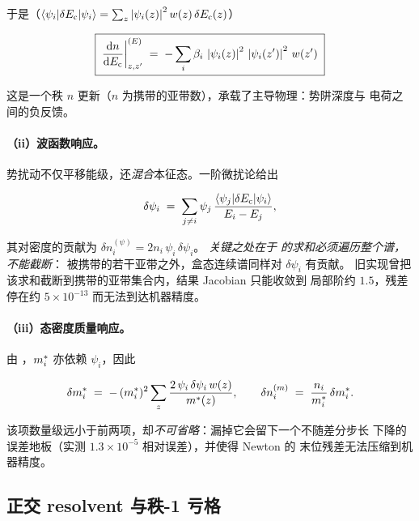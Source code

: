 于是（$\left\langle \psi_i|\delta E_{\mathrm{c}}|\psi_i \right\rangle=\sum_z\left\lvert \psi_i(z) \right\rvert^{2}w(z)\,\delta E_{\mathrm{c}}(z)$）

\begin{equation}
\boxed{\;
\frac{\mathrm{d} n}{\mathrm{d} E_{\mathrm{c}}}\bigg|^{(E)}_{z,z'}
\;=\; -\sum_i \beta_i\,\left\lvert \psi_i(z) \right\rvert^{2}\,\left\lvert \psi_i(z') \right\rvert^{2}\,w(z')
\;}
\label{eq:resp-energy}
\end{equation}

这是一个秩 $n$ 更新（$n$ 为携带的亚带数），承载了主导物理：势阱深度与
电荷之间的负反馈。

\paragraph{（ii）波函数响应。}
势扰动不仅平移能级，还\emph{混合}本征态。一阶微扰论给出

\begin{equation}
\delta\psi_i \;=\; \sum_{j\neq i} \psi_j\,
\frac{\left\langle \psi_j|\delta E_{\mathrm{c}}|\psi_i \right\rangle}{E_{i}-E_{j}},
\label{eq:psi-response}
\end{equation}

其对密度的贡献为 $\delta n_i^{(\psi)} = 2 n_i\,\psi_i\,\delta\psi_i$。
\emph{关键之处在于  的求和必须遍历整个谱，不能截断}：
被携带的若干亚带之外，盒态连续谱同样对 $\delta\psi_i$ 有贡献。
旧实现曾把该求和截断到携带的亚带集合内，结果 Jacobian 只能收敛到
局部阶约 $1.5$，残差停在约 $5\times10^{-13}$ 而无法到达机器精度。

\paragraph{（iii）态密度质量响应。}
由 ，$m^{*}_i$ 亦依赖 $\psi_i$，因此

\begin{equation}
\delta m^{*}_i \;=\; -\,(m^{*}_i)^{2}\sum_z \frac{2\,\psi_i\,\delta\psi_i\,w(z)}{m^{*}(z)},
\qquad
\delta n_i^{(m)} \;=\; \frac{n_i}{m^{*}_i}\,\delta m^{*}_i .
\label{eq:mass-response}
\end{equation}

该项数量级远小于前两项，却\emph{不可省略}：漏掉它会留下一个不随差分步长
下降的误差地板（实测 $1.3\times10^{-5}$ 相对误差），并使得 Newton 的
末位残差无法压缩到机器精度。

\subsection{正交 resolvent 与秩-1 亏格}
\label{sec:sp1d-resolvent}

